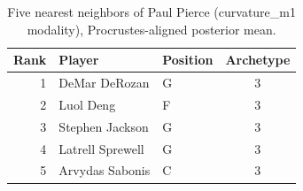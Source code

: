 \begin{table}[htbp]
  \centering\small
  \begin{tabular}{rllc}
    \toprule
    Rank & Player & Position & Archetype \\
    \midrule
    1 & DeMar DeRozan & G & 3 \\
    2 & Luol Deng & F & 3 \\
    3 & Stephen Jackson & G & 3 \\
    4 & Latrell Sprewell & G & 3 \\
    5 & Arvydas Sabonis & C & 3 \\
    \bottomrule
  \end{tabular}
  \caption{Five nearest neighbors of Paul Pierce (curvature_m1 modality), Procrustes-aligned posterior mean.}
  \label{tab:Paul_Pierce_neighbors_curvature_m1}
\end{table}

